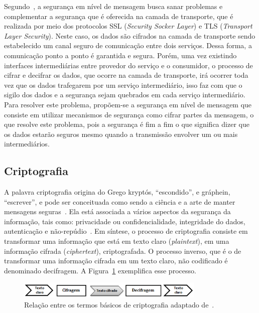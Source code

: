 Segundo~\cite{SOASecurity2008}, a segurança em nível de mensagem busca sanar problemas e complementar a segurança que é oferecida na camada de transporte, que é realizada por meio dos protocolos SSL (\emph{Security Socker Layer}) e TLS (\emph{Transport Layer Security}). Neste caso, os dados são cifrados na camada de transporte sendo estabelecido um canal seguro de comunicação entre dois serviços. Dessa forma, a comunicação ponto a ponto é garantida e segura. Porém, uma vez existindo interfaces intermediárias entre provedor do serviço e o consumidor, o processo de cifrar e decifrar os dados, que ocorre na camada de transporte, irá ocorrer toda vez que os dados trafegarem por um serviço intermediário, isso faz com que o sigilo dos dados e a segurança sejam quebrados em cada serviço intermediário. Para resolver este problema, propõem-se a segurança em nível de mensagem que consiste em utilizar mecanismos de segurança como cifrar partes da mensagem, o que resolve este problema, pois a segurança é fim a fim o que significa dizer que os dados estarão seguros mesmo quando a transmissão envolver um ou mais intermediários.

\subsection{Criptografia}

A palavra criptografia origina do Grego kryptós, ``escondido'', e gráphein, ``escrever'',  e pode ser  conceituada como sendo a ciência e a arte de manter mensagens seguras~\cite{Schneier1995}. Ela está  associada a vários aspectos da segurança da informação, tais como: privacidade ou confidencialidade, integridade do dados, autenticação e não-repúdio~\cite{Menezes1996}. Em síntese, o processo de criptografia consiste em transformar uma informação que está em texto claro (\emph{plaintext}), em uma informação cifrada (\emph{ciphertext}), criptografada. O processo inverso, que é o de transformar uma informação cifrada em um texto claro, não codificado é denominado decifragem. A Figura~\ref{fig:processocriptografia} exemplifica esse processo.

\begin{figure}[!htb]
\centering
\includegraphics[width=0.8\textwidth]{processocriptografia1.png}
\caption{Relação entre os termos  básicos de criptografia adaptado de~\cite{Schneier1995}.}
\label{fig:processocriptografia}
\end{figure}

